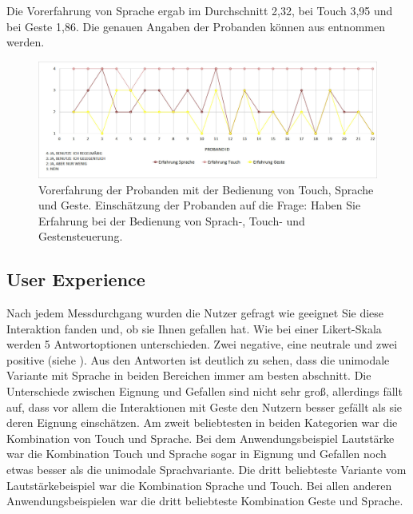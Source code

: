 Die Vorerfahrung von Sprache ergab im Durchschnitt 2,32, bei Touch 3,95 und bei Geste 1,86. Die genauen Angaben der Probanden können aus  entnommen werden.
\begin{figure}[ht]
  \centering
  \includegraphics[width=1\textwidth]{img/ErfahrungProbanden2.jpg}
  \caption[Vorerfahrung der Probanden]{Vorerfahrung der Probanden mit der Bedienung von Touch, Sprache und Geste. Einschätzung der Probanden auf die Frage: Haben Sie Erfahrung bei der Bedienung von Sprach-, Touch- und Gestensteuerung.}
  \label{fig:Vorerfahrung}
\end{figure} 
\subsection[User Experience]{User Experience}
Nach jedem Messdurchgang wurden die Nutzer gefragt wie geeignet Sie diese Interaktion fanden und, ob sie Ihnen gefallen hat. Wie bei einer Likert-Skala werden 5 Antwortoptionen unterschieden. Zwei negative, eine neutrale und zwei positive (siehe ). Aus den Antworten ist deutlich zu sehen, dass die unimodale Variante mit Sprache in beiden Bereichen immer am besten abschnitt. Die Unterschiede zwischen Eignung und Gefallen sind nicht sehr groß, allerdings fällt auf, dass vor allem die Interaktionen mit Geste den Nutzern besser gefällt als sie deren Eignung einschätzen. Am zweit beliebtesten in beiden Kategorien war die Kombination von Touch und Sprache. Bei dem Anwendungsbeispiel Lautstärke war die Kombination Touch und Sprache sogar in Eignung und Gefallen noch etwas besser als die unimodale Sprachvariante. Die dritt beliebteste Variante vom Lautstärkebeispiel war die Kombination Sprache und Touch. Bei allen anderen Anwendungsbeispielen war die dritt beliebteste Kombination Geste und Sprache. 

